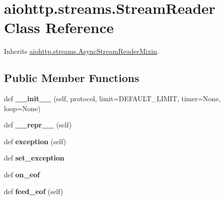 \hypertarget{classaiohttp_1_1streams_1_1_stream_reader}{}\section{aiohttp.\+streams.\+Stream\+Reader Class Reference}
\label{classaiohttp_1_1streams_1_1_stream_reader}


Inherits \hyperlink{classaiohttp_1_1streams_1_1_async_stream_reader_mixin}{aiohttp.\+streams.\+Async\+Stream\+Reader\+Mixin}.

\subsection*{Public Member Functions}
\begin{DoxyCompactItemize}
\item 
\mbox{\label{classaiohttp_1_1streams_1_1_stream_reader_a77c53c83c2c8b9cbac49c29851b53a10}} 
def {\bfseries \+\_\+\+\_\+init\+\_\+\+\_\+} (self, protocol, limit=D\+E\+F\+A\+U\+L\+T\+\_\+\+L\+I\+M\+IT, timer=None, loop=None)
\item 
\mbox{\label{classaiohttp_1_1streams_1_1_stream_reader_a730612ab7d613025e0817ad392fb252c}} 
def {\bfseries \+\_\+\+\_\+repr\+\_\+\+\_\+} (self)
\item 
\mbox{\label{classaiohttp_1_1streams_1_1_stream_reader_ab532c739a4518624b75d3fd448c907ed}} 
def {\bfseries exception} (self)
\item 
\mbox{\label{classaiohttp_1_1streams_1_1_stream_reader_a4f6f1eb3536fa1026f0cd70b23b356b5}} 
def {\bfseries set\+\_\+exception}
\item 
\mbox{\label{classaiohttp_1_1streams_1_1_stream_reader_a95069df69bb07e5333092c074df1ff14}} 
def {\bfseries on\+\_\+eof}
\item 
\mbox{\label{classaiohttp_1_1streams_1_1_stream_reader_aa874ffa42c74a5529a191b2b4f0c35d0}} 
def {\bfseries feed\+\_\+eof} (self)
\item 

\end{DoxyCompactItemize}
